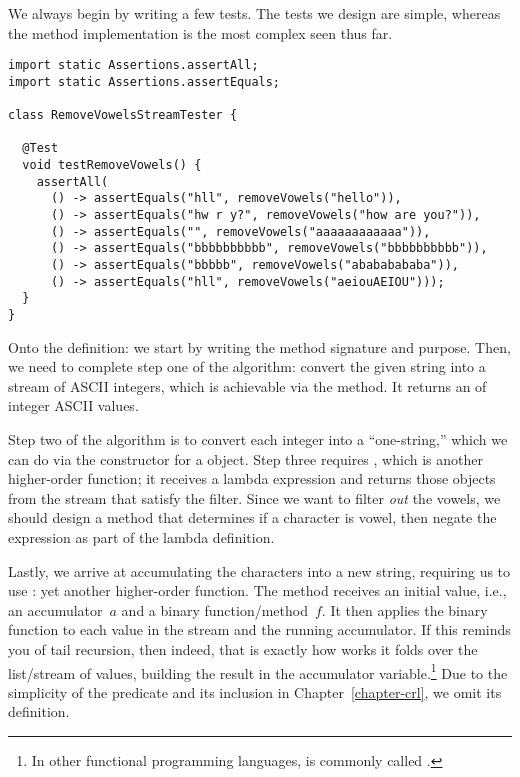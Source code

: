 We always begin by writing a few tests. 
The tests we design are simple, whereas the method implementation is the most complex seen thus far.

\begin{lstlisting}[language=MyJava]
import static Assertions.assertAll;
import static Assertions.assertEquals;

class RemoveVowelsStreamTester {
  
  @Test
  void testRemoveVowels() {
    assertAll(
      () -> assertEquals("hll", removeVowels("hello")),
      () -> assertEquals("hw r y?", removeVowels("how are you?")),
      () -> assertEquals("", removeVowels("aaaaaaaaaaaa")),
      () -> assertEquals("bbbbbbbbbb", removeVowels("bbbbbbbbbb")),
      () -> assertEquals("bbbbb", removeVowels("abababababa")),
      () -> assertEquals("hll", removeVowels("aeiouAEIOU")));
  }
}
\end{lstlisting}

Onto the definition: we start by writing the method signature and purpose. 
Then, we need to complete step one of the algorithm: convert the given string into a stream of ASCII integers, which is achievable via the  method. It returns an  of integer ASCII values. 

Step two of the algorithm is to convert each integer into a ``one-string,'' which we can do via the constructor for a  object. 
Step three requires , which is another higher-order function; it receives a lambda expression and returns those objects from the stream that satisfy the filter. 
Since we want to filter \emph{out} the vowels, we should design a method that determines if a character is vowel, then negate the expression as part of the lambda definition. 

Lastly, we arrive at accumulating the characters into a new string, requiring us to use : yet another higher-order function. 
The  method receives an initial value, i.e., an accumulator~$a$ and a binary function/method~$f$. 
It then applies the binary function to each value in the stream and the running accumulator. If this reminds you of tail recursion, then indeed, that is exactly how  works it folds over the list/stream of values, building the result in the accumulator variable.\footnote{In other functional programming languages,  is commonly called .} 
Due to the simplicity of the  predicate and its inclusion in Chapter~\ref{chapter-crl}, we omit its definition.

